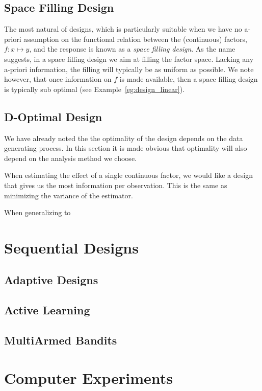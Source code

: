\subsection{Space Filling Design}
The most natural of designs, which is particularly suitable when we have no a-priori assumption on the functional relation between the (continuous) factors, $f:x \mapsto y$,  and the response is known as a \emph{space filling design}.
As the name suggests, in a space filling design we aim at filling the factor space. Lacking any a-priori information, the filling will typically be as uniform as possible. 
We note however, that once information on $f$ is made available, then a space filling design is typically sub optimal (see Example~\ref{eg:design_linear}).



\subsection{D-Optimal Design}
We have already noted the the optimality of the design depends on the data generating process.
In this section it is made obvious that optimality will also depend on the analysis method we choose.

When estimating the effect of a single continuous factor, we would like a design that gives us the most information per observation. This is the same as minimizing the variance of the estimator. 

When generalizing to 







\section{Sequential Designs}


\subsection{Adaptive Designs}


\subsection{Active Learning}


\subsection{MultiArmed Bandits}






\section{Computer Experiments}


